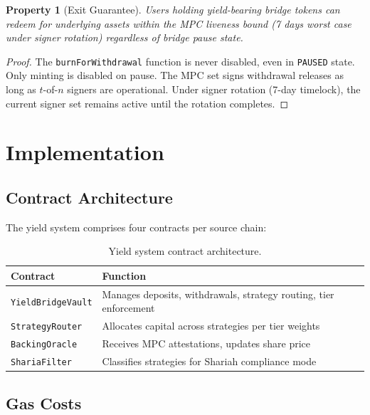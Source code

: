 \documentclass[11pt,twocolumn]{article}
\newtheorem{property}{Property}[section]
\begin{document}
\begin{property}[Exit Guarantee]
Users holding yield-bearing bridge tokens can redeem for underlying assets within the MPC liveness bound (7 days worst case under signer rotation) regardless of bridge pause state.
\end{property}

\begin{proof}
The \texttt{burnForWithdrawal} function is never disabled, even in \texttt{PAUSED} state. Only minting is disabled on pause. The MPC set signs withdrawal releases as long as $t$-of-$n$ signers are operational. Under signer rotation (7-day timelock), the current signer set remains active until the rotation completes.
\end{proof}

\section{Implementation}\label{sec:implementation}

\subsection{Contract Architecture}

The yield system comprises four contracts per source chain:

\begin{table}[h]
\centering
\small
\caption{Yield system contract architecture.}
\label{tab:contracts}
\begin{tabular}{@{}lp{4.8cm}@{}}
\toprule
\textbf{Contract} & \textbf{Function} \\
\midrule
\texttt{YieldBridgeVault} & Manages deposits, withdrawals, strategy routing, tier enforcement \\
\texttt{StrategyRouter} & Allocates capital across strategies per tier weights \\
\texttt{BackingOracle} & Receives MPC attestations, updates share price \\
\texttt{ShariaFilter} & Classifies strategies for Shariah compliance mode \\
\bottomrule
\end{tabular}
\end{table}

\subsection{Gas Costs}
\end{document}
